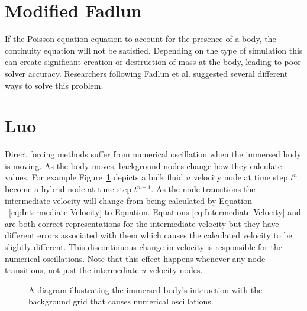 \documentclass[onehalf,11pt]{beavtex}
\begin{document}
\section{Modified Fadlun}
If the Poisson equation  equation to account for the presence of a body, the continuity equation will not be satisfied. 
Depending on the type of simulation this can create significant creation or destruction of mass at the body, leading to poor solver accuracy.
Researchers following  Fadlun et al. suggested several different ways to solve this problem.

\section{Luo}

Direct forcing methods suffer from numerical oscillation when the immersed body is moving.
As the body moves, background nodes change how they calculate values. 
For example Figure~\ref{fig:Temporal Discontinuity} depicts a bulk fluid $u$ velocity node at time step $t^n$ become a hybrid node at time step $t^{n+1}$.
As the node transitions the intermediate velocity will change from being calculated by Equation ~\eqref{eq:Intermediate Velocity} to Equation.
Equations \eqref{eq:Intermediate Velocity} and  are both correct representations for the intermediate velocity but they have different errors associated with them which causes the calculated velocity to be slightly different.
This discontinuous change in velocity is responsible for the numerical oscillations.
Note that this effect happens whenever any node transitions, not just the intermediate $u$ velocity nodes.

\begin{figure}[htb]
    \centering
    
    \caption{A diagram illustrating the immersed body's interaction with the background grid that causes numerical oscillations.}
    \label{fig:Temporal Discontinuity}
\end{figure}
\end{document}
